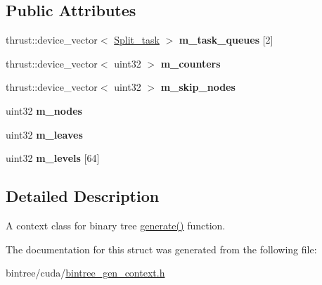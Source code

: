 \subsection*{\-Public \-Attributes}
\begin{DoxyCompactItemize}
\item 
\hypertarget{structnih_1_1cuda_1_1_bintree__gen__context_a26408efc7e295c303bb1faf54dda5556}{
thrust\-::device\-\_\-vector$<$ \hyperlink{structnih_1_1cuda_1_1_bintree__gen__context_1_1_split__task}{\-Split\-\_\-task} $>$ {\bfseries m\-\_\-task\-\_\-queues} \mbox{[}2\mbox{]}}
\label{structnih_1_1cuda_1_1_bintree__gen__context_a26408efc7e295c303bb1faf54dda5556}

\item 
\hypertarget{structnih_1_1cuda_1_1_bintree__gen__context_ae7d5e70aa5a11ddc573e3f1defab2ad6}{
thrust\-::device\-\_\-vector$<$ uint32 $>$ {\bfseries m\-\_\-counters}}
\label{structnih_1_1cuda_1_1_bintree__gen__context_ae7d5e70aa5a11ddc573e3f1defab2ad6}

\item 
\hypertarget{structnih_1_1cuda_1_1_bintree__gen__context_aad5723ca83eb42272f52e76dc00e68cf}{
thrust\-::device\-\_\-vector$<$ uint32 $>$ {\bfseries m\-\_\-skip\-\_\-nodes}}
\label{structnih_1_1cuda_1_1_bintree__gen__context_aad5723ca83eb42272f52e76dc00e68cf}

\item 
\hypertarget{structnih_1_1cuda_1_1_bintree__gen__context_afb4526ed7429a12e59f4f2c40881c1c8}{
uint32 {\bfseries m\-\_\-nodes}}
\label{structnih_1_1cuda_1_1_bintree__gen__context_afb4526ed7429a12e59f4f2c40881c1c8}

\item 
\hypertarget{structnih_1_1cuda_1_1_bintree__gen__context_a11b983b19b3c56c85c7e7260f5877a21}{
uint32 {\bfseries m\-\_\-leaves}}
\label{structnih_1_1cuda_1_1_bintree__gen__context_a11b983b19b3c56c85c7e7260f5877a21}

\item 
\hypertarget{structnih_1_1cuda_1_1_bintree__gen__context_a54ee7cbc8971257667e450f2dc45ce8d}{
uint32 {\bfseries m\-\_\-levels} \mbox{[}64\mbox{]}}
\label{structnih_1_1cuda_1_1_bintree__gen__context_a54ee7cbc8971257667e450f2dc45ce8d}

\end{DoxyCompactItemize}


\subsection{\-Detailed \-Description}
\-A context class for binary tree \hyperlink{group__bintree_gad76a50ae08ab4d525f748a7cbcc0fb6e}{generate()} function. 

\-The documentation for this struct was generated from the following file\-:\begin{DoxyCompactItemize}
\item 
bintree/cuda/\hyperlink{bintree__gen__context_8h}{bintree\-\_\-gen\-\_\-context.\-h}\end{DoxyCompactItemize}
